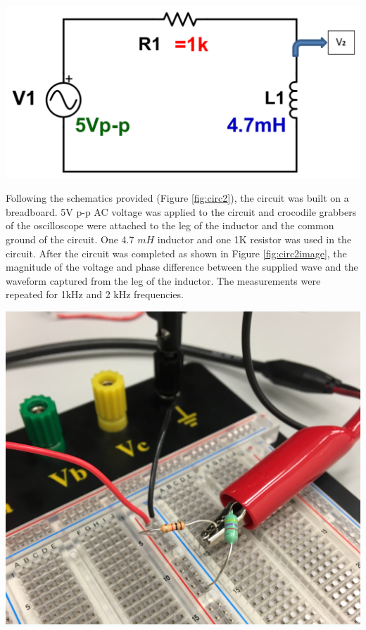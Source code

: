 \documentclass[journal]{IEEEtran}
\begin{document}
\begingroup
    \centering
    \medskip
    \includegraphics[width=\columnwidth]{images/lab8_circuit2.png}
    \label{fig:circ2}
    \medskip
\endgroup

\noindent Following the schematics provided (Figure \ref{fig:circ2}), the circuit was built on a breadboard. 5V p-p AC voltage was applied to the circuit and crocodile grabbers of the oscilloscope were attached to the leg of the inductor and the common ground of the circuit. One 4.7 $mH$ inductor and one 1K \ohm resistor was used in the circuit. After the circuit was completed as shown in Figure \ref{fig:circ2image}, the magnitude of the voltage and phase difference between the supplied wave and the waveform captured from the leg of the inductor. The measurements were repeated for 1kHz and 2 kHz frequencies.

\begingroup
    \centering
    \medskip
    \includegraphics[width=\columnwidth]{images/lab8_circ2.jpg}
    \label{fig:circ2image}
    \medskip
\endgroup
\end{document}

